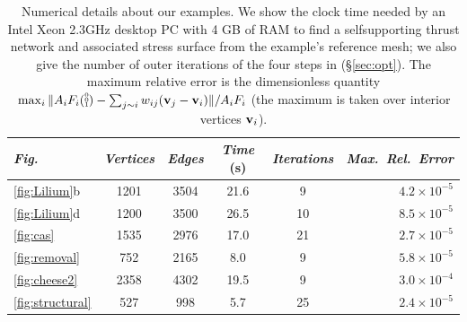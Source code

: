 \documentclass[annual]{acmsiggraph}
\newcommand{\secref}[1]{(\S\ref{#1})}
\begin{document}
\begin{table}[t]
\begin{tabular}{@{}lccccr@{}}
		 \textit{Fig.}
		& \textit{Vertices}
		& \textit{Edges}
			& \textit{Time} (s)
			& \!\!\!\textit{Iterations} \!\!\!\!
			& \textit{Max.\ Rel.\ Error} \\
	\hline
		 \protect\ref{fig:Lilium}b
		& 1201
		& 3504
			& 21.6
			& 9
			& $4.2 \times 10^{-5}$
	\\ %
		 \protect\ref{fig:Lilium}d
		& 1200
		& 3500
			& 26.5
			& 10
			& $8.5 \times 10^{-5}$
	\\ %
		 \protect\ref{fig:cas}
		& 1535
		& 2976
			& 17.0
			& 21
			& $2.7\times 10^{-5}$
	\\ %
		 \protect\ref{fig:removal}
		& 752
		& 2165
			& 8.0
			& 9
			& $5.8 \times 10^{-5}$
	\\ %
		 \protect\ref{fig:cheese2}
		& 2358
		& 4302
			& 19.5
			& 9
			& $3.0 \times 10^{-4}$
	\\ %
		 \protect\ref{fig:structural}
		& 527
		& 998
			& 5.7
			& 25
			& $2.4\times 10^{-5}$
	\\ \hline
  \end{tabular}
 \def\Tmp{A_iF_i(\raise.4ex\hbox{\tiny
	$\begin{array}{@{}c@{}}0\\[-1ex]0\\[-1ex]1\end{array}$})}
	\caption{Numerical details about our examples.
We show the clock time needed by an Intel Xeon 2.3GHz
desktop PC with 4 GB of RAM to find a self\dash supporting thrust network and
associated stress surface from the example's reference mesh; we also give
the number of outer iterations of the four steps in \secref{sec:opt}. The
maximum relative error is the dimensionless quantity
$\max_i \| \protect\Tmp - \sum\nolimits_{j\sim i} w_{ij}
(\vw_j-\vw_i) \|/A_i F_i$ (the maximum is
taken over interior vertices ${\mathbf v}_i$).}\label{table:data}

\end{table}
\end{document}

